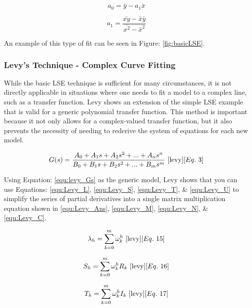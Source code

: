 \begin{equation}
    \label{equ:LSE_solc}
    a_0 = \bar{y} - a_1 \bar{x}
\end{equation}

\begin{equation}
    \label{equ:LSE_sold}
    a_1 = \frac{\bar{xy} - \bar{x}\bar{y}}{\bar{x^2} - \bar{x}^2}
\end{equation}

An example of this type of fit can be seen in Figure: \ref{fig:basicLSE}.


\subsubsection{Levy's Technique - Complex Curve Fitting}
While the basic LSE technique is sufficient for many circumstances, it is not directly applicable in situations where one needs to fit a model to a complex line, such as a transfer function. Levy \cite{levy} shows an extension of the simple LSE example that is valid for a generic polynomial transfer function. This method is important because it not only allows for a complex-valued transfer function, but it also prevents the necessity of needing to rederive the system of equations for each new model. 

\begin{equation}
    \label{equ:levy_Gs}
    G(s) = \frac{A_0 + A_1 s + A_2 s^2 + ... + A_n s^n}{B_0 + B_1 s + B_2 s^2 + ... + B_m s^m}
    ~\cite{levy}[Eq.~3]
\end{equation}

Using Equation: \eqref{equ:levy_Gs} as the generic model, Levy shows that you can use Equations: \eqref{equ:Levy_L}, \eqref{equ:Levy_S}, \eqref{equ:Levy_T}, \& \eqref{equ:Levy_U} to simplify the series of partial derivatives into a single matrix multiplication equation shown in \eqref{equ:Levy_Ans}, \eqref{equ:Levy_M}, \eqref{equ:Levy_N}, \& \eqref{equ:Levy_C}.

\begin{equation}
    \label{equ:Levy_L}
    \lambda _h = \sum_{k=0}^{m} \omega _k ^h
    ~\cite{levy}[Eq.~15]
\end{equation}

\begin{equation}
    \label{equ:Levy_S}
    S_h = \sum_{k=0}^{m} \omega _k ^h R_k
    ~\cite{levy}[Eq.~16]
\end{equation}

\begin{equation}
    \label{equ:Levy_T}
    T_h = \sum_{k=0}^{m} \omega _k ^h I_k
    ~\cite{levy}[Eq.~17]
\end{equation}


